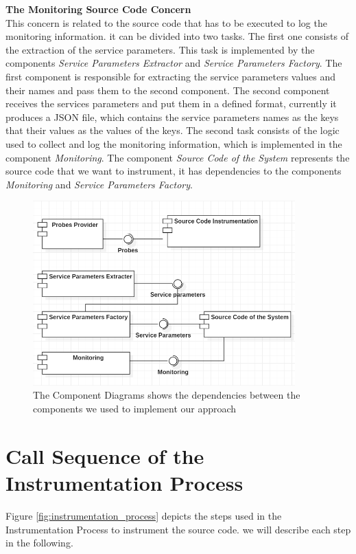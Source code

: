 \textbf{The Monitoring Source Code Concern}\\
This concern is related to the source code that has to be executed to log the monitoring information. it can be divided into two tasks. The first one consists of the extraction of the service parameters. This task is implemented by the components \textit{Service Parameters Extractor} and \textit{Service Parameters Factory}. The first component is responsible for extracting the service parameters values and their names and pass them to the second component. The second component receives the services parameters and put them in a defined format, currently it produces a JSON file, which contains the service parameters names as the keys that their values as the values of the keys. The second task consists of the logic used to collect and log the monitoring information, which is implemented in the component \textit{Monitoring}. The component \textit{Source Code of the System} represents the source code that we want to instrument, it has dependencies to the components \textit{Monitoring} and \textit{Service Parameters Factory}.\\ 

\begin{figure}[h]
\centering
\includegraphics[width=0.9\textwidth]{figures/architecture}
\caption{The Component Diagrams shows the dependencies between the components we used to implement our approach}
\label{fig:architecture}
\end{figure}

\section{Call Sequence of the Instrumentation Process}
\label{sec:Call Sequence of the Instrumentation Process}
Figure \ref{fig:instrumentation_process} depicts the steps used in the Instrumentation Process to instrument the source code. we will describe each step in the following. \\


